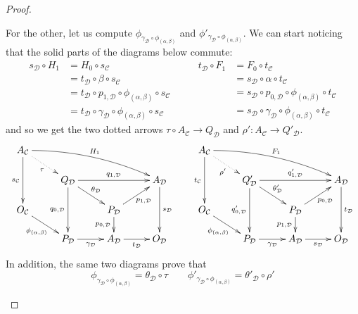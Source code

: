 \documentclass[a4paper,UKenglish,cleveref,pdftex,thm-restate,numberwithinsect]{lipics-v2021}
\begin{document}
\begin{proof}
\begin{enumerate}
\begin{itemize}
				For the other, let us compute $\phi_{\gamma_{\mathcal{D}}\circ \phi_{(\alpha, \beta)}}$ and $\phi'_{\gamma_{\mathcal{D}}\circ \phi_{(\alpha, \beta)}}$. We can start noticing that the solid parts of the diagrams below commute:
				\[\begin{split}
					s_{\mathcal{D}}\circ H_1&=H_0\circ s_{\mathcal{C}}\\&= t_{\mathcal{D}} \circ \beta \circ s_{\mathcal{C}}\\&=t_{\mathcal{D}}\circ p_{1, \mathcal{D}} \circ \phi_{(\alpha, \beta)} \circ s_{\mathcal{C}}\\&=t_{\mathcal{D}}\circ \gamma_{\mathcal{D}}\circ  \phi_{(\alpha, \beta)} \circ s_{\mathcal{C}}
				\end{split} \qquad \begin{split}
				t_{\mathcal{D}}\circ F_1&=F_0\circ t_{\mathcal{C}}\\&= s_{\mathcal{D}} \circ \alpha \circ t_{\mathcal{C}}\\&=s_{\mathcal{D}}\circ p_{0, \mathcal{D}} \circ \phi_{(\alpha, \beta)} \circ t_{\mathcal{C}}\\&=s_{\mathcal{D}}\circ \gamma_{\mathcal{D}}\circ  \phi_{(\alpha, \beta)} \circ t_{\mathcal{C}}
				\end{split}\]
		and so we get the two dotted arrows $\tau \circ A_{\mathcal{C}}\to Q_{\mathcal{D}}$ and $\rho'\colon A_{\mathcal{C}}\to Q'_{\mathcal{D}}$.
				 \[\xymatrix@C=26pt@R=15pt{ A_{\mathcal{C}} \ar[dd]_{s_{\mathcal{C}}}\ar@/^.3cm/[drrr]^{H_1} \ar@{.>}[dr]_{\tau} & & & & A_{\mathcal{C}} \ar[dd]_{t_{\mathcal{C}}} \ar@{.>}[dr]_{\rho'}\ar@/^.3cm/[drrr]^{F_1}\\& Q_{\mathcal{D}} \ar[rr]^{q_{1, \mathcal{D}}}  \ar[dd]_{q_{0, \mathcal{D}}} \ar[dr]^{\theta_{\mathcal{D}}}& & A_{\mathcal{D}} \ar[dd]^{s_{\mathcal{D}}} & & Q'_{\mathcal{D}} \ar[rr]^{q'_{1, \mathcal{D}}}  \ar[dd]_{q'_{0, \mathcal{D}}} \ar[dr]^{\theta'_{\mathcal{D}}}& & A_{\mathcal{D}} \ar[dd]^{t_{\mathcal{D}}}\\ O_{\mathcal{C}} \ar[dr]_{\phi_{(\alpha, \beta)}} &&  P_{\mathcal{D}} \ar[ur]_{p_{1, \mathcal{D}}} \ar[d]_{p_{0, \mathcal{D}}}&&  O_{\mathcal{C}} \ar[dr]_{\phi_{(\alpha, \beta)}}  &&  P_{\mathcal{D}} \ar[ur]_{p_{0, \mathcal{D}}} \ar[d]_{p_{1, \mathcal{D}}}\\ & P_{\mathcal{D}} \ar[r]_{\gamma_{\mathcal{D}}}& A_{\mathcal{D}} \ar[r]_{t_{\mathcal{D}}} & O_{\mathcal{D}} &  & P_{\mathcal{D}}\ar[r]_{\gamma_{\mathcal{D}}}& A_{\mathcal{D}} \ar[r]_{s_{\mathcal{D}}} & O_{\mathcal{D}}}\]
			In addition, the same two diagrams prove that
			\[\phi_{\gamma_{\mathcal{D}}\circ \phi_{(\alpha, \beta)}}= \theta_{\mathcal{D}}\circ \tau \qquad  \phi'_{\gamma_{\mathcal{D}}\circ \phi_{(\alpha, \beta)}} = \theta'_{\mathcal{D}} \circ \rho'\]
			

\end{itemize}
\end{enumerate}
\end{proof}
\end{document}
